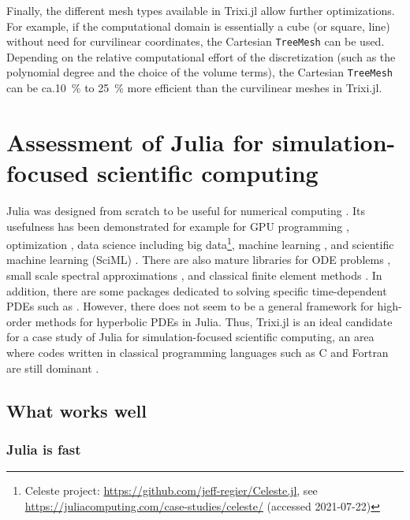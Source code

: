 \documentclass{juliacon}
\makeatletter
\newcommand{\ca}[0]{{ca.\@}\xspace}
\newcommand{\trixi}{Trixi.jl\xspace}
\makeatother
\begin{document}
Finally, the different mesh types available in \trixi allow further optimizations.
For example, if the computational domain is essentially a cube (or square, line)
without need for curvilinear coordinates, the Cartesian \lstinline{TreeMesh} can
be used. Depending on the relative computational effort of the discretization
(such as the polynomial degree and the choice of the volume terms), the
Cartesian \lstinline{TreeMesh} can be \ca \SI{10}{\percent} to \SI{25}{\percent}
more efficient than the curvilinear meshes in \trixi.

\section{Assessment of Julia for simulation-focused scientific computing}
\label{sec:assessment-of-julia}

Julia was designed from scratch to be useful for numerical computing
\cite{bezanson2017julia}. Its usefulness has been demonstrated for example for
GPU programming \cite{besard2018juliagpu, omlin2020solving},
optimization \cite{dunning2017jump}, data science including
big data\footnote{Celeste project: \url{https://github.com/jeff-regier/Celeste.jl},
see \url{https://juliacomputing.com/case-studies/celeste/} (accessed 2021-07-22)},
machine learning \cite{innes2018fashionable}, and scientific machine learning
(SciML) \cite{pal2021opening}. There are also mature libraries for ODE problems
\cite{rackauckas2017differentialequations}, small scale spectral approximations
\cite{olver2014practical}, and classical finite element methods \cite{badia2020gridap}.
In addition, there are some packages dedicated to solving specific time-dependent
PDEs such as \cite{ramadhan2020oceananigans, constantinou2021geophysicalflows}.
However, there does not seem to be a general framework for high-order methods
for hyperbolic PDEs in Julia. Thus, \trixi is an ideal candidate for a case study
of Julia for simulation-focused scientific computing, an area where codes written
in classical programming languages such as C and Fortran are still dominant
\cite{krais2021flexi, parsani2021ssdc}.

\subsection{What works well}

\subsubsection{Julia is fast}
\end{document}
